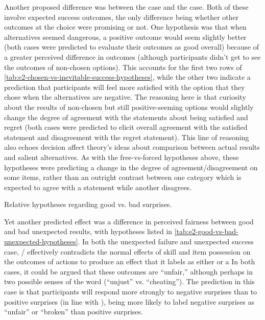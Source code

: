 Another proposed difference was between the \exps{} case and the \obvsm{} case.
%
Both of these involve expected success outcomes, the only difference being whether other outcomes at the choice were promising or not.
%
One hypothesis was that when alternatives seemed dangerous, a positive outcome would seem slightly better (both cases were predicted to evaluate their outcomes as good overall) because of a greater perceived difference in outcomes (although participants didn't get to see the outcomes of non-chosen options).
%
This accounts for the first two rows of \cref{tab:e2-chosen-vs-inevitable-success-hypotheses}, while the other two indicate a prediction that participants will feel more satisfied with the option that they chose when the alternatives are negative.
%
The reasoning here is that curiosity about the results of non-chosen but still positive-seeming options would slightly change the degree of agreement with the statements about being satisfied and regret (both cases were predicted to elicit overall agreement with the satisfied statement and disagreement with the regret statement).
%
This line of reasoning also echoes decision affect theory's ideas about comparison between actual results and salient alternatives.
%
As with the free-vs-forced hypotheses above, these hypotheses were predicting a change in the degree of agreement/disagreement on some items, rather than an outright contrast between one category which is expected to agree with a statement while another disagrees.


\begin{table}[tb]
\centering
\bgroup
\def\arraystretch{1.3}
\setlength{\tabcolsep}{0.6em}

\egroup
\caption[Retrospective good vs\@. bad unexpected hypotheses]{Relative hypotheses regarding good vs\@. bad surprises.}
\label{tab:e2-good-vs-bad-unexpected-hypotheses}
\end{table}


Yet another predicted effect was a difference in perceived fairness between good and bad unexpected results, with hypotheses listed in \cref{tab:e2-good-vs-bad-unexpected-hypotheses}.
%
In both the unexpected failure and unexpected success case, \dunyazad/ effectively contradicts the normal effects of skill and item possession on the outcomes of actions to produce an effect that it labels as either  or a 
%
In both cases, it could be argued that these outcomes are ``unfair,'' although perhaps in two possible senses of the word (``unjust'' vs\@. ``cheating'').
%
The prediction in this case is that participants will respond more strongly to negative surprises than to positive surprises (in line with \citep{Shepperd2002}), being more likely to label negative surprises as ``unfair'' or ``broken'' than positive surprises.



